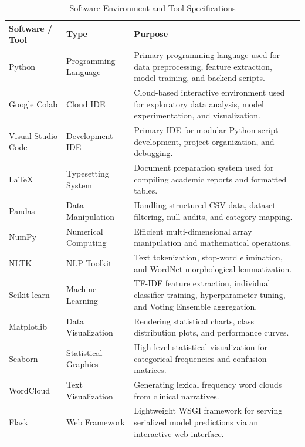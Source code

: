\begin{table}[H]
\centering
\small
\renewcommand{\arraystretch}{1.15}
\setlength{\tabcolsep}{5pt}
\begin{tabularx}{\linewidth}{|>{\raggedright\arraybackslash}p{3.0cm}|>{\raggedright\arraybackslash}p{3.0cm}|>{\raggedright\arraybackslash}X|}
\hline
\textbf{Software / Tool} & \textbf{Type} & \textbf{Purpose} \\
\hline
Python & Programming Language & Primary programming language used for data preprocessing, feature extraction, model training, and backend scripts. \\
\hline
Google Colab & Cloud IDE & Cloud-based interactive environment used for exploratory data analysis, model experimentation, and visualization. \\
\hline
Visual Studio Code & Development IDE & Primary IDE for modular Python script development, project organization, and debugging. \\
\hline
\LaTeX & Typesetting System & Document preparation system used for compiling academic reports and formatted tables. \\
\hline
Pandas & Data Manipulation & Handling structured CSV data, dataset filtering, null audits, and category mapping. \\
\hline
NumPy & Numerical Computing & Efficient multi-dimensional array manipulation and mathematical operations. \\
\hline
NLTK & NLP Toolkit & Text tokenization, stop-word elimination, and WordNet morphological lemmatization. \\
\hline
Scikit-learn & Machine Learning & TF-IDF feature extraction, individual classifier training, hyperparameter tuning, and Voting Ensemble aggregation. \\
\hline
Matplotlib & Data Visualization & Rendering statistical charts, class distribution plots, and performance curves. \\
\hline
Seaborn & Statistical Graphics & High-level statistical visualization for categorical frequencies and confusion matrices. \\
\hline
WordCloud & Text Visualization & Generating lexical frequency word clouds from clinical narratives. \\
\hline
Flask & Web Framework & Lightweight WSGI framework for serving serialized model predictions via an interactive web interface. \\
\hline
\end{tabularx}
\caption{Software Environment and Tool Specifications}
\label{tab:software_environment}
\end{table}

